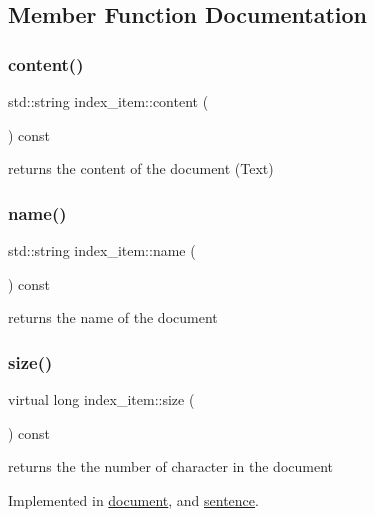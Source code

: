 \subsection{Member Function Documentation}
\mbox{\label{classindex__item_aafe86cc0ad7284d6db317588f63d1cb2}} 
\subsubsection{\texorpdfstring{content()}{content()}}
{\footnotesize\ttfamily std\+::string index\+\_\+item\+::content (\begin{DoxyParamCaption}{ }\end{DoxyParamCaption}) const}

returns the content of the document (Text) \mbox{\label{classindex__item_a1bcb5c577c3986549330c3aa283a6a5e}} 
\subsubsection{\texorpdfstring{name()}{name()}}
{\footnotesize\ttfamily std\+::string index\+\_\+item\+::name (\begin{DoxyParamCaption}{ }\end{DoxyParamCaption}) const}

returns the name of the document \mbox{\label{classindex__item_a7c16d6bca513663fab66d40a6c0289a9}} 
\subsubsection{\texorpdfstring{size()}{size()}}
{\footnotesize\ttfamily virtual long index\+\_\+item\+::size (\begin{DoxyParamCaption}{ }\end{DoxyParamCaption}) const\hspace{0.3cm}{\ttfamily [pure virtual]}}

returns the the number of character in the document 

Implemented in \hyperlink{classdocument_aad56f03674964346987dc7afd18aacf1}{document}, and \hyperlink{classsentence_ad673d4210850083f621383e2629a7b0e}{sentence}.



